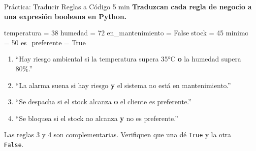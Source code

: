 \documentclass[aspectratio=169, 11pt]{beamer}
\begin{document}
\begin{frame}[fragile,shrink=30]{Práctica: Traducir Reglas a Código \hfill {\normalsize\color{arcaRed}\faClock\hspace{4pt}5 min}}
  \vspace{-6pt}
  {\small\color{arcaDark}\bfseries
    Traduzcan cada regla de negocio a una expresión booleana en Python.}

  \vspace{4pt}
  \begin{pyblock}
temperatura = 38
humedad = 72
en_mantenimiento = False
stock = 45
minimo = 50
es_preferente = True
  \end{pyblock}

  \vspace{4pt}
  {\footnotesize\color{textMuted}
  \begin{enumerate}\setlength{\itemsep}{4pt}
    \item[{\color{arcaRed}\bfseries 1.}]
      ``Hay riesgo ambiental si la temperatura supera 35°C
      \textbf{o} la humedad supera 80\%.''
    \item[{\color{arcaRed}\bfseries 2.}]
      ``La alarma suena si hay riesgo
      \textbf{y} el sistema no está en mantenimiento.''
    \item[{\color{arcaRed}\bfseries 3.}]
      ``Se despacha si el stock alcanza
      \textbf{o} el cliente es preferente.''
    \item[{\color{arcaRed}\bfseries 4.}]
      ``Se bloquea si el stock no alcanza
      \textbf{y} no es preferente.''
  \end{enumerate}
  }

  \vspace{3pt}
  {\scriptsize\color{arcaDark}
    Las reglas 3 y 4 son complementarias.
    Verifiquen que una dé \texttt{True} y la otra \texttt{False}.}
\end{frame}
\end{document}
